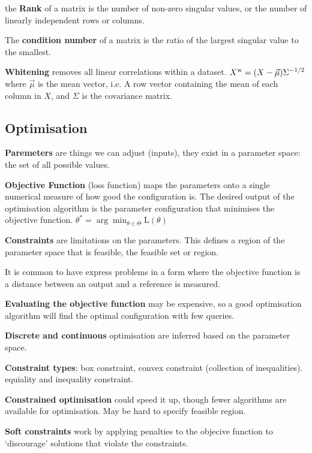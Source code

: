 \documentclass{article}
\begin{document}
\noindent the \textbf{Rank} of a matrix is the number of non-zero singular values,
or the number of linearly independent rows or columns.

\noindent The \textbf{condition number} of a matrix is the ratio of the largest singular value to the smallest.

\noindent \textbf{Whitening} removes all linear correlations within a dataset.
$X^{\text w} = (X - \vec{\mu}) \Sigma^{-1/2}$ where $\vec{\mu}$ is the mean vector, i.e.
A row vector containing the mean of each column in $X$, and $\Sigma$ is the covariance matrix.


\subsection*{Optimisation}
\textbf{Paremeters} are things we can adjust (inputs), they exist in a parameter space: the set of all possible values.

\noindent \textbf{Objective Function} (loss function) maps the parameters onto a single numerical measure of how good the configuration is.
The desired output of the optimisation algorithm is the parameter configuration that minimises the objective function.
$\theta^* = \arg \min_{\theta \in \Theta} \text{L}(\theta)$

\noindent \textbf{Constraints} are limitations on the parameters. This defines a region of the parameter space that is feasible,
the feasible set or region.

\noindent It is common to have express problems in a form where the objective function is a distance between an output
and a reference is measured.

\noindent \textbf{Evaluating the objective function} may be expensive, so a good optimisation algorithm will find the optimal
configuration with few queries.

\noindent \textbf{Discrete and continuous} optimisation are inferred based on the parameter space.

\noindent \textbf{Constraint types}: box constraint, convex constraint (collection of inequalities).
equiality and inequality constraint.

\noindent \textbf{Constrained optimisation} could speed it up, though fewer algorithms are available for optimisation.
May be hard to specify feasible region.

\noindent \textbf{Soft constraints} work by applying penalties to the objecive function to `discourage' solutions that violate the constraints.
\end{document}
